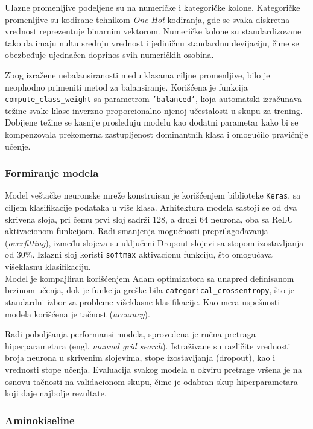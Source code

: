 \documentclass[a4paper,12pt]{article}
\begin{document}
Ulazne promenljive podeljene su na numeričke i kategoričke kolone. Kategoričke promenljive su kodirane tehnikom \textit{One-Hot} kodiranja, gde se svaka diskretna vrednost reprezentuje binarnim vektorom. Numeričke kolone su standardizovane tako da imaju nultu srednju vrednost i jediničnu standardnu devijaciju, čime se obezbeđuje ujednačen doprinos svih numeričkih osobina.

Zbog izražene nebalansiranosti među klasama ciljne promenljive, bilo je neophodno primeniti metod za balansiranje. Korišćena je funkcija \\ \texttt{compute\_class\_weight} sa parametrom \texttt{'balanced'}, koja automatski izračunava težine svake klase inverzno proporcionalno njenoj učestalosti u skupu za trening. Dobijene težine se kasnije prosleđuju modelu kao dodatni parametar kako bi se kompenzovala prekomerna zastupljenost dominantnih klasa i omogućilo pravičnije učenje.

\subsubsection*{Formiranje modela}

Model veštačke neuronske mreže konstruisan je korišćenjem biblioteke \texttt{Keras}, sa ciljem klasifikacije podataka u više klasa. Arhitektura modela sastoji se od dva skrivena sloja, pri čemu prvi sloj sadrži 128, a drugi 64 neurona, oba sa ReLU aktivacionom funkcijom. Radi smanjenja mogućnosti preprilagođavanja (\textit{overfitting}), između slojeva su uključeni Dropout slojevi sa stopom izostavljanja od 30\%. Izlazni sloj koristi \texttt{softmax} aktivacionu funkciju, što omogućava višeklasnu klasifikaciju.
\\
Model je kompajliran korišćenjem Adam optimizatora sa unapred definisanom brzinom učenja, dok je funkcija greške bila \texttt{categorical\_crossentropy}, što je standardni izbor za probleme višeklasne klasifikacije. Kao mera uspešnosti modela korišćena je tačnost (\textit{accuracy}).

Radi poboljšanja performansi modela, sprovedena je ručna pretraga hiperparametara (engl. \textit{manual grid search}). Istraživane su različite vrednosti broja neurona u skrivenim slojevima, stope izostavljanja (dropout), kao i vrednosti stope učenja. Evaluacija svakog modela u okviru pretrage vršena je na osnovu tačnosti na validacionom skupu, čime je odabran skup hiperparametara koji daje najbolje rezultate.

\subsubsection*{Aminokiseline}
\end{document}
